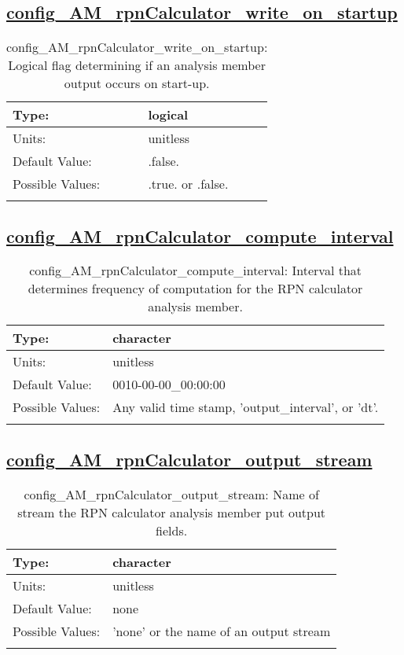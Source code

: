 \subsection[config\_AM\_rpnCalculator\_write\_on\_startup]{\hyperref[sec:nm_tab_AM_rpnCalculator]{config\_AM\_rpnCalculator\_write\_on\_startup}}
\label{subsec:nm_sec_config_AM_rpnCalculator_write_on_startup}
\begin{center}
\begin{longtable}{| p{2.0in} || p{4.0in} |}
    \hline
    Type: & logical \\
    \hline
    Units: & \si{unitless} \\
    \hline
    Default Value: & .false. \\
    \hline
    Possible Values: & .true. or .false. \\
    \hline
    \caption{config\_AM\_rpnCalculator\_write\_on\_startup: Logical flag determining if an analysis member output occurs on start-up.}
\end{longtable}
\end{center}
\subsection[config\_AM\_rpnCalculator\_compute\_interval]{\hyperref[sec:nm_tab_AM_rpnCalculator]{config\_AM\_rpnCalculator\_compute\_interval}}
\label{subsec:nm_sec_config_AM_rpnCalculator_compute_interval}
\begin{center}
\begin{longtable}{| p{2.0in} || p{4.0in} |}
    \hline
    Type: & character \\
    \hline
    Units: & \si{unitless} \\
    \hline
    Default Value: & 0010-00-00\_00:00:00 \\
    \hline
    Possible Values: & Any valid time stamp, 'output\_interval', or 'dt'. \\
    \hline
    \caption{config\_AM\_rpnCalculator\_compute\_interval: Interval that determines frequency of computation for the RPN calculator analysis member.}
\end{longtable}
\end{center}
\subsection[config\_AM\_rpnCalculator\_output\_stream]{\hyperref[sec:nm_tab_AM_rpnCalculator]{config\_AM\_rpnCalculator\_output\_stream}}
\label{subsec:nm_sec_config_AM_rpnCalculator_output_stream}
\begin{center}
\begin{longtable}{| p{2.0in} || p{4.0in} |}
    \hline
    Type: & character \\
    \hline
    Units: & \si{unitless} \\
    \hline
    Default Value: & none \\
    \hline
    Possible Values: & 'none' or the name of an output stream \\
    \hline
    \caption{config\_AM\_rpnCalculator\_output\_stream: Name of stream the RPN calculator analysis member put output fields.}
\end{longtable}
\end{center}
